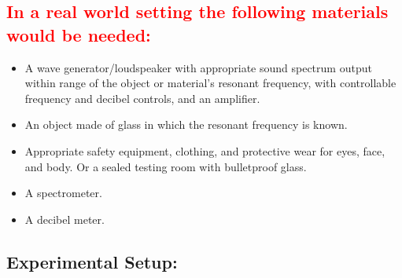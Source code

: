\documentclass[12pt]{article}
\begin{document}
\subsection*{\textcolor{red}{In a real world setting the following materials would be needed:}}

\begin{itemize}
    \item A wave generator/loudspeaker with appropriate sound spectrum output within range of the object or material's resonant frequency, with controllable frequency and decibel controls, and an amplifier.
    \item An object made of glass in which the resonant frequency is known.
    \item Appropriate safety equipment, clothing, and protective wear for eyes, face, and body. Or a sealed testing room with bulletproof glass.
    \item A spectrometer.
    \item A decibel meter.
\end{itemize}

\subsection*{Experimental Setup:}
\end{document}
